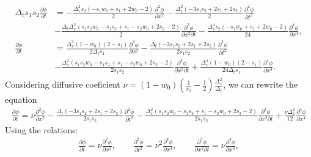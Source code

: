 \documentclass[letterpaper,10pt,english,openany,oneside]{jupyterBook}
\begin{document}
\begin{equation*}
\begin{split}
\begin{array}{rl}
\Delta_{t} s_{1} s_{2} \displaystyle\frac{\partial \phi}{\partial t} &= - \displaystyle\frac{\Delta_{x}^{2} s_{2} \left(- s_{1} w_{0} + s_{1} + 2 w_{0} - 2\right)}{2} \frac{\partial^{2}\phi}{\partial x^{2}} -\frac{\Delta_{t}^{2} \left(- 3 s_{1} s_{2} + 2 s_{1} + 2 s_{2}\right)}{2} \frac{\partial^{2}\phi}{\partial t^{2}}  \\
&- \displaystyle\frac{\Delta_{t} \Delta_{x}^{2} \left(s_{1} s_{2} w_{0} - s_{1} s_{2} + s_{1} - s_{2} w_{0} + 2 s_{2} - 2\right)}{2} \frac{\partial^{3}\phi}{\partial x^{2}\partial t} - \frac{\Delta_{x}^{4} s_{2} \left(- s_{1} w_{0} + s_{1} + 2 w_{0} - 2\right)}{24} \frac{\partial^{4}\phi}{\partial x^{4}},\\
\displaystyle\frac{\partial \phi}{\partial t} &= \displaystyle\frac{\Delta_{x}^{2} (1-w_{0})\left(2 - s_{1}\right)}{2\Delta_{t} s_{1} } \frac{\partial^{2}\phi}{\partial x^{2}} - \frac{\Delta_{t} \left(- 3 s_{1} s_{2} + 2 s_{1} + 2 s_{2}\right)}{2 s_{1} s_{2}} \frac{\partial^{2}\phi}{\partial t^{2}}  \\
&- \displaystyle\frac{\Delta_{x}^{2} \left(s_{1} s_{2} w_{0} - s_{1} s_{2} + s_{1} - s_{2} w_{0} + 2 s_{2} - 2\right)}{2 s_{1} s_{2}} \frac{\partial^{3}\phi}{\partial x^{2}\partial t} + \frac{\Delta_{x}^{4} (1-w_{0})\left(2 - s_{1}\right)}{24\Delta_{t} s_{1}} \frac{\partial^{4}\phi}{\partial x^{4}}.
\end{array}
\end{split}
\end{equation*}
\sphinxAtStartPar
Considering diffusive coeficient \(\nu=(1-w_{0})\left(\frac{1}{s_{1}} - \frac{1}{2}\right)\frac{\Delta_{x}^{2}}{\Delta_{t}}\), we can rewrite the equation
\begin{equation*}
\begin{split}
\frac{\partial \phi}{\partial t} = \nu\frac{\partial^{2}\phi}{\partial x^{2}} -\frac{\Delta_{t} \left(- 3 s_{1} s_{2} + 2 s_{1} + 2 s_{2}\right)}{2 s_{1} s_{2}} \frac{\partial^{2}\phi}{\partial t^{2}}  - \frac{ \Delta_{x}^{2} \left(s_{1} s_{2} w_{0} - s_{1} s_{2} + s_{1} - s_{2} w_{0} + 2 s_{2} - 2\right)}{2 s_{1} s_{2}} \frac{\partial^{3}\phi}{\partial x^{2}\partial t} + \frac{\nu\Delta_{x}^{2}}{12} \frac{\partial^{4}\phi}{\partial x^{4}}
\end{split}
\end{equation*}
\sphinxAtStartPar
Using the relations:
\begin{equation*}
\begin{split}
\frac{\partial\phi}{\partial t} = \nu \frac{\partial^{2}\phi}{\partial x^{2}}, \qquad \frac{\partial^{2}\phi}{\partial t^{2}} = \nu^{2} \frac{\partial^{4}\phi}{\partial x^{4}}, \qquad \frac{\partial^{3}\phi}{\partial x^{2}\partial t} = \nu \frac{\partial^{4}\phi}{\partial x^{4}},
\end{split}
\end{equation*}
\end{document}

